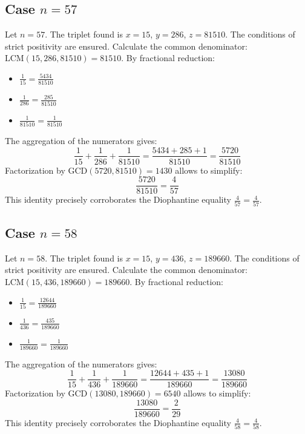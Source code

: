 \documentclass[11pt,a4paper]{article}
\begin{document}
\subsection{Case $n = 57$}
Let $n = 57$. The triplet found is $x = 15$, $y = 286$, $z = 81510$.
The conditions of strict positivity are ensured.
Calculate the common denominator: $\text{LCM}(15, 286, 81510) = 81510$.
By fractional reduction:
\begin{itemize}
    \item $\frac{1}{15} = \frac{5434}{81510}$
    \item $\frac{1}{286} = \frac{285}{81510}$
    \item $\frac{1}{81510} = \frac{1}{81510}$
\end{itemize}
The aggregation of the numerators gives:
$$ \frac{1}{15} + \frac{1}{286} + \frac{1}{81510} = \frac{5434 + 285 + 1}{81510} = \frac{5720}{81510} $$
Factorization by $\text{GCD}(5720, 81510) = 1430$ allows to simplify:
$$ \frac{5720}{81510} = \frac{4}{57} $$
This identity precisely corroborates the Diophantine equality $\frac{4}{57} = \frac{4}{57}$.

\subsection{Case $n = 58$}
Let $n = 58$. The triplet found is $x = 15$, $y = 436$, $z = 189660$.
The conditions of strict positivity are ensured.
Calculate the common denominator: $\text{LCM}(15, 436, 189660) = 189660$.
By fractional reduction:
\begin{itemize}
    \item $\frac{1}{15} = \frac{12644}{189660}$
    \item $\frac{1}{436} = \frac{435}{189660}$
    \item $\frac{1}{189660} = \frac{1}{189660}$
\end{itemize}
The aggregation of the numerators gives:
$$ \frac{1}{15} + \frac{1}{436} + \frac{1}{189660} = \frac{12644 + 435 + 1}{189660} = \frac{13080}{189660} $$
Factorization by $\text{GCD}(13080, 189660) = 6540$ allows to simplify:
$$ \frac{13080}{189660} = \frac{2}{29} $$
This identity precisely corroborates the Diophantine equality $\frac{4}{58} = \frac{4}{58}$.
\end{document}
